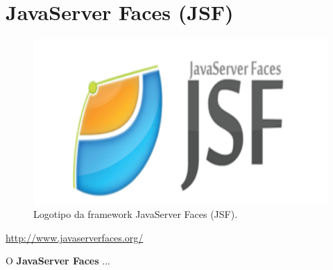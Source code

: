 \section{JavaServer Faces (JSF)}
\label{subsec:jsf}

\begin{figure}[H]
    \centering
    \includegraphics[scale=0.1]{images/jsf.png}
    \caption{Logotipo da framework JavaServer Faces (JSF).}
    \label{fig:jsf}
\end{figure}

\href{http://www.javaserverfaces.org/}{http://www.javaserverfaces.org/}

\hspace{5mm} O \textbf{JavaServer Faces} ...